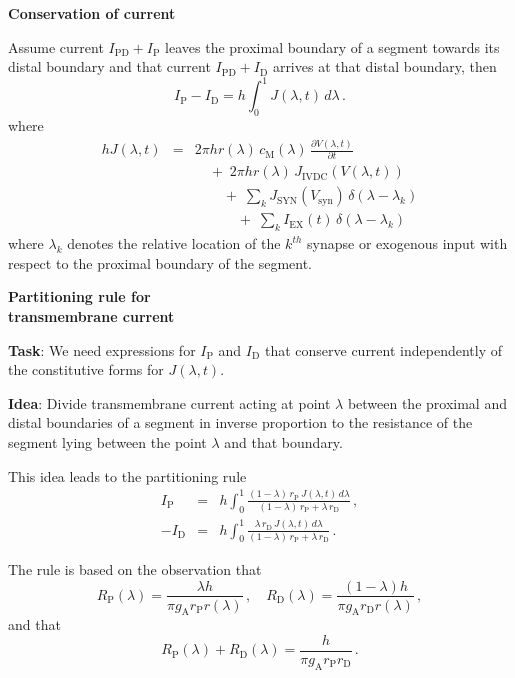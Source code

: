 \documentclass{slides}
\def\ds{\displaystyle}
\begin{document}
%
%
\begin{slide}
\centerline{\textbf{Conservation of current}}

Assume current $I_\mathrm{PD}+I_\mathrm{P}$ leaves the proximal
boundary of a segment towards its distal boundary and that current
$I_\mathrm{PD}+I_\mathrm{D}$ arrives at that distal boundary, then
\[
I_\mathrm{P}-I_\mathrm{D}=h\int_0^1 J(\lambda,t)\,d\lambda\,.
\]
where
\[
\begin{array}{rcl}
h J(\lambda,t) & = & \ds 2\pi h r(\lambda)\,c_\mathrm{M}(\lambda)\,
\frac{\partial V(\lambda,t)}{\partial t}\\[15pt]
&&\quad\ds+\;2\pi h r(\lambda)\,J_\mathrm{IVDC}(V(\lambda,t))\\[10pt]
&&\qquad \ds+\; \sum_k J_\mathrm{SYN}(V_\mathrm{syn})\,
\delta(\lambda-\lambda_k)\\[10pt]
&&\qquad\quad\ds+\;\sum_k I_\mathrm{EX}(t)\,
\delta(\lambda-\lambda_k)
\end{array}
\]
where $\lambda_k$ denotes the relative location of the $k^{th}$
synapse or exogenous input with respect to the proximal boundary
of the segment.
\end{slide}

%
%
\begin{slide}
\begin{center}
\textbf{Partitioning rule for \\ transmembrane current}
\end{center}

\textbf{Task}: We need expressions for $I_\mathrm{P}$ and
$I_\mathrm{D}$ that conserve current independently of the
constitutive forms for $J(\lambda,t)$.

\textbf{Idea}: Divide transmembrane current acting at point
$\lambda$ between the proximal and distal boundaries of
a segment in inverse proportion to the resistance of the segment
lying between the point $\lambda$ and that boundary.

This idea leads to the partitioning rule
\[
\begin{array}{rcl}
I_\mathrm{P} & = & \ds h\int_0^1 \frac{(1-\lambda)\,r_\mathrm{P}\,
J(\lambda,t)\,d\lambda}{(1-\lambda)\,r_\mathrm{P}
+\lambda\,r_\mathrm{D}}\,,\\[25pt]
-I_\mathrm{D} & = & \ds h\int_0^1
\frac{\lambda\,r_\mathrm{D}\,J(\lambda,t)\,d\lambda}
{(1-\lambda)\,r_\mathrm{P}+\lambda\,r_\mathrm{D}}\,.
\end{array}
\]

The rule is based on the observation that
\[
R_\mathrm{P}(\lambda) = \frac{\lambda h} {\pi g_\mathrm{A}
r_\mathrm{P} r(\lambda)}\,,\quad R_\mathrm{D}(\lambda) =
\frac{(1-\lambda)h} {\pi g_\mathrm{A} r_\mathrm{D}
r(\lambda)}\,,
\]
and that
\[
R_\mathrm{P}(\lambda)+R_\mathrm{D}(\lambda) =
\frac{h} {\pi g_\mathrm{A} r_\mathrm{P} r_\mathrm{D}}\,.
\]
\end{slide}
\end{document}

